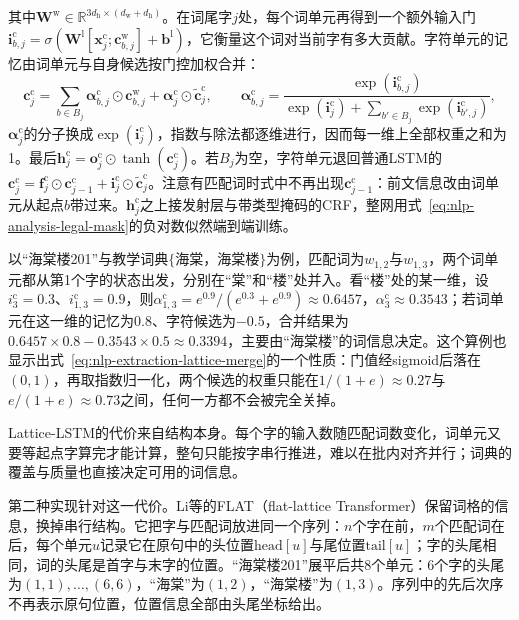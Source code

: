 其中$\bm W^{\mathrm w}\in\mathbb R^{3d_{\mathrm h}\times(d_{\mathrm w}+d_{\mathrm h})}$。在词尾字$j$处，每个词单元再得到一个额外输入门$\bm i^{\mathrm c}_{b,j}=\sigma(\bm W^{\mathrm l}[\bm x^{\mathrm c}_j;\bm c^{\mathrm w}_{b,j}]+\bm b^{\mathrm l})$，它衡量这个词对当前字有多大贡献。字符单元的记忆由词单元与自身候选按门控加权合并：
\begin{equation}
  \bm c^{\mathrm c}_j=\sum_{b\in B_j}\bm\alpha^{\mathrm c}_{b,j}\odot\bm c^{\mathrm w}_{b,j}+\bm\alpha^{\mathrm c}_j\odot\tilde{\bm c}^{\mathrm c}_j,
  \qquad
  \bm\alpha^{\mathrm c}_{b,j}=\frac{\exp(\bm i^{\mathrm c}_{b,j})}{\exp(\bm i^{\mathrm c}_j)+\sum_{b'\in B_j}\exp(\bm i^{\mathrm c}_{b',j})},
  \label{eq:nlp-extraction-lattice-merge}
\end{equation}
$\bm\alpha^{\mathrm c}_j$的分子换成$\exp(\bm i^{\mathrm c}_j)$，指数与除法都逐维进行，因而每一维上全部权重之和为1。最后$\bm h^{\mathrm c}_j=\bm o^{\mathrm c}_j\odot\tanh(\bm c^{\mathrm c}_j)$。若$B_j$为空，字符单元退回普通LSTM的$\bm c^{\mathrm c}_j=\bm f^{\mathrm c}_j\odot\bm c^{\mathrm c}_{j-1}+\bm i^{\mathrm c}_j\odot\tilde{\bm c}^{\mathrm c}_j$。注意有匹配词时式中不再出现$\bm c^{\mathrm c}_{j-1}$：前文信息改由词单元从起点$b$带过来。$\bm h^{\mathrm c}_j$之上接发射层与带类型掩码的CRF，整网用式~\eqref{eq:nlp-analysis-legal-mask}的负对数似然端到端训练。

以“海棠楼201”与教学词典$\{$海棠，海棠楼$\}$为例，匹配词为$w_{1,2}$与$w_{1,3}$，两个词单元都从第1个字的状态出发，分别在“棠”和“楼”处并入。看“楼”处的某一维，设$i^{\mathrm c}_3=0.3$、$i^{\mathrm c}_{1,3}=0.9$，则$\alpha^{\mathrm c}_{1,3}=e^{0.9}/(e^{0.3}+e^{0.9})\approx0.6457$，$\alpha^{\mathrm c}_3\approx0.3543$；若词单元在这一维的记忆为0.8、字符候选为$-0.5$，合并结果为$0.6457\times0.8-0.3543\times0.5\approx0.3394$，主要由“海棠楼”的词信息决定。这个算例也显示出式~\eqref{eq:nlp-extraction-lattice-merge}的一个性质：门值经sigmoid后落在$(0,1)$，再取指数归一化，两个候选的权重只能在$1/(1+e)\approx0.27$与$e/(1+e)\approx0.73$之间，任何一方都不会被完全关掉。

Lattice-LSTM的代价来自结构本身。每个字的输入数随匹配词数变化，词单元又要等起点字算完才能计算，整句只能按字串行推进，难以在批内对齐并行；词典的覆盖与质量也直接决定可用的词信息。

第二种实现针对这一代价。Li等的FLAT（flat-lattice Transformer）保留词格的信息，换掉串行结构。它把字与匹配词放进同一个序列：$n$个字在前，$m$个匹配词在后，每个单元$u$记录它在原句中的头位置$\mathrm{head}[u]$与尾位置$\mathrm{tail}[u]$；字的头尾相同，词的头尾是首字与末字的位置。“海棠楼201”展平后共8个单元：6个字的头尾为$(1,1),\ldots,(6,6)$，“海棠”为$(1,2)$，“海棠楼”为$(1,3)$。序列中的先后次序不再表示原句位置，位置信息全部由头尾坐标给出。

